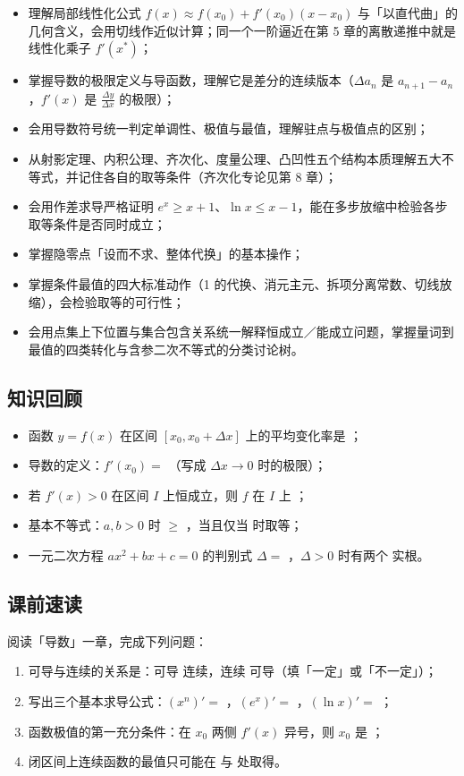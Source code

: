 \begin{learnobjective}
\begin{itemize}
  \item 理解局部线性化公式 $f(x)\approx f(x_0)+f'(x_0)(x-x_0)$ 与「以直代曲」的几何含义，会用切线作近似计算；同一个一阶逼近在第 5 章的离散递推中就是线性化乘子 $f'(x^*)$；
  \item 掌握导数的极限定义与导函数，理解它是差分的连续版本（$\Delta a_n$ 是 $a_{n+1}-a_n$，$f'(x)$ 是 $\frac{\Delta y}{\Delta x}$ 的极限）；
  \item 会用导数符号统一判定单调性、极值与最值，理解驻点与极值点的区别；
  \item 从射影定理、内积公理、齐次化、度量公理、凸凹性五个结构本质理解五大不等式，并记住各自的取等条件（齐次化专论见第 8 章）；
  \item 会用作差求导严格证明 $e^x\ge x+1$、$\ln x\le x-1$，能在多步放缩中检验各步取等条件是否同时成立；
  \item 掌握隐零点「设而不求、整体代换」的基本操作；
  \item 掌握条件最值的四大标准动作（1 的代换、消元主元、拆项分离常数、切线放缩），会检验取等的可行性；
  \item 会用点集上下位置与集合包含关系统一解释恒成立／能成立问题，掌握量词到最值的四类转化与含参二次不等式的分类讨论树。
\end{itemize}
\end{learnobjective}

\begin{preview}
\subsection*{知识回顾}
\begin{itemize}
  \item 函数 $y=f(x)$ 在区间 $[x_0,x_0+\Delta x]$ 上的平均变化率是 \blank；
  \item 导数的定义：$f'(x_0)=$ \blank（写成 $\Delta x\to0$ 时的极限）；
  \item 若 $f'(x)>0$ 在区间 $I$ 上恒成立，则 $f$ 在 $I$ 上 \blank；
  \item 基本不等式：$a,b>0$ 时 \blank $\ge$ \blank，当且仅当 \blank 时取等；
  \item 一元二次方程 $ax^2+bx+c=0$ 的判别式 $\Delta=$ \blank，$\Delta>0$ 时有两个 \blank 实根。
\end{itemize}

\subsection*{课前速读}
阅读「导数」一章，完成下列问题：
\begin{enumerate}
  \item 可导与连续的关系是：可导 \blank 连续，连续 \blank 可导（填「一定」或「不一定」）；
  \item 写出三个基本求导公式：$(x^n)'=$ \blank，$(e^x)'=$ \blank，$(\ln x)'=$ \blank；
  \item 函数极值的第一充分条件：在 $x_0$ 两侧 $f'(x)$ 异号，则 $x_0$ 是 \blank；
  \item 闭区间上连续函数的最值只可能在 \blank 与 \blank 处取得。
\end{enumerate}
\end{preview}

